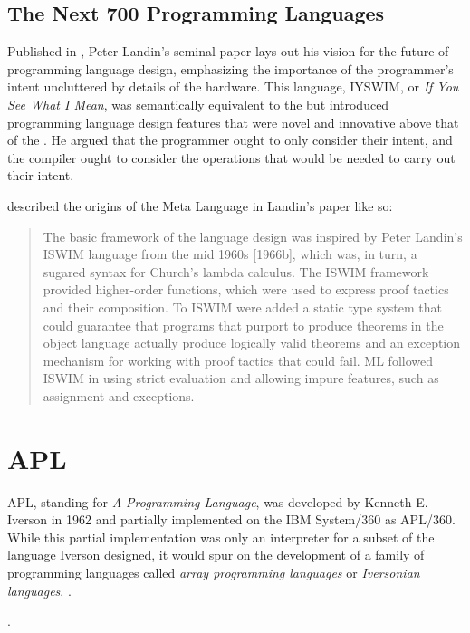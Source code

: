 \subsection{The Next 700 Programming Languages}

Published in \citeyear{landin_next_700_prog_langs_1966},
Peter Landin's seminal paper  lays out his vision for
the future of programming language design, emphasizing the importance of the programmer's intent
uncluttered by details of the hardware.
This language, IYSWIM, or \textit{If You See What I Mean}, was semantically
equivalent to the \lambdacalc but introduced programming language design features
that were novel and innovative above that of the \lambdacalc.
He argued that the programmer ought to only consider their intent, and the compiler ought to
consider the operations that would be needed to carry out their intent.

\citeauthor{hopl_history_of_ml_2020} described the origins of the Meta Language in Landin's paper
like so\cite{hopl_history_of_ml_2020}:

\begin{quotation}
	The basic framework of the language design was inspired by Peter Landin’s ISWIM language
	from the mid 1960s [1966b], which was, in turn, a sugared syntax for Church’s lambda calculus. The
	ISWIM framework provided higher-order functions, which were used to express proof tactics and
	their composition. To ISWIM were added a static type system that could guarantee that programs
	that purport to produce theorems in the object language actually produce logically valid theorems
	and an exception mechanism for working with proof tactics that could fail. ML followed ISWIM in
	using strict evaluation and allowing impure features, such as assignment and exceptions.
\end{quotation}

\section{APL}

APL, standing for \textit{A Programming Language}, was developed by Kenneth E. Iverson in 1962
and partially implemented on the IBM System/360 as APL/360.
While this partial implementation was only an interpreter for a subset of the language Iverson
designed, it would spur on the development of a family of programming languages
called \textit{array programming languages} or \textit{Iversonian languages}.
.

.
